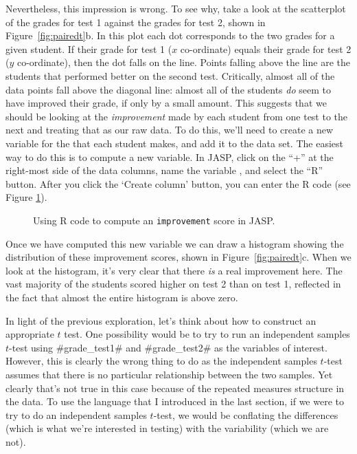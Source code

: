Nevertheless, this impression is wrong. To see why, take a look at the scatterplot of the grades for test 1 against the grades for test 2,  shown in Figure~\ref{fig:pairedt}b. In this plot each dot corresponds to the two grades for a given student. If their grade for test 1 ($x$ co-ordinate) equals their grade for test 2 ($y$ co-ordinate), then the dot falls on the line. Points falling above the line are the students that performed better on the second test. Critically, almost all of the data points fall above the diagonal line: almost all of the students {\it do} seem to have improved their grade, if only by a small amount. This suggests that we should be looking at the {\it improvement} made by each student from one test to the next and treating that as our raw data. To do this, we'll need to create a new variable for the  that each student makes, and add it to the  data set. The easiest way to do this is to compute a new variable.  In JASP, click on the ``+'' at the right-most side of the data columns, name the variable , and select the ``R'' button.  After you click the `Create column' button, you can enter the R code  (see Figure \ref{fig:improvement}).

\vspace{0.5cm}
\begin{figure}[htb]
\begin{center}
\caption{Using R code to compute an \texttt{improvement} score in JASP.}
\HR
\label{fig:improvement}
\end{center}
\end{figure}


Once we have computed this new  variable we can draw a histogram showing the distribution of these improvement scores, shown in Figure~\ref{fig:pairedt}c. When we look at the  histogram, it's very clear that there {\it is} a real improvement here. The vast majority of the students scored higher on test 2 than on test 1, reflected in the fact that almost the entire histogram is above zero. 


In light of the previous exploration, let's think about how to construct an appropriate $t$ test. One possibility would be to try to run an independent samples $t$-test using \rtextverb#grade_test1# and \rtextverb#grade_test2# as the variables of interest. However, this is clearly the wrong thing to do as the independent samples $t$-test assumes that there is no particular relationship between the two samples. Yet clearly that's not true in this case because of the repeated measures structure in the data. To use the language that I introduced in the last section, if we were to try to do an independent samples $t$-test, we would be conflating the  differences (which is what we're interested in testing) with the  variability (which we are not). 

